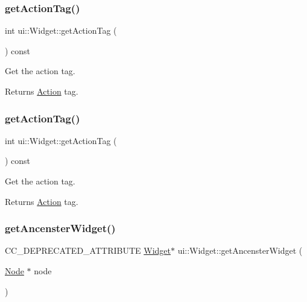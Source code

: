 \mbox{\label{classui_1_1Widget_abced1bc5fc63741d0625f37bf4f234c2}} 
\subsubsection{\texorpdfstring{get\+Action\+Tag()}{getActionTag()}\hspace{0.1cm}{\footnotesize\ttfamily [1/2]}}
{\footnotesize\ttfamily int ui\+::\+Widget\+::get\+Action\+Tag (\begin{DoxyParamCaption}{ }\end{DoxyParamCaption}) const}

Get the action tag. \begin{DoxyReturn}{Returns}
\hyperlink{classAction}{Action} tag. 
\end{DoxyReturn}
\mbox{\label{classui_1_1Widget_abced1bc5fc63741d0625f37bf4f234c2}} 
\subsubsection{\texorpdfstring{get\+Action\+Tag()}{getActionTag()}\hspace{0.1cm}{\footnotesize\ttfamily [2/2]}}
{\footnotesize\ttfamily int ui\+::\+Widget\+::get\+Action\+Tag (\begin{DoxyParamCaption}{ }\end{DoxyParamCaption}) const}

Get the action tag. \begin{DoxyReturn}{Returns}
\hyperlink{classAction}{Action} tag. 
\end{DoxyReturn}
\mbox{\label{classui_1_1Widget_a84a716b7fe8a0e98444a6a231e011fe0}} 
\subsubsection{\texorpdfstring{get\+Ancenster\+Widget()}{getAncensterWidget()}}
{\footnotesize\ttfamily C\+C\+\_\+\+D\+E\+P\+R\+E\+C\+A\+T\+E\+D\+\_\+\+A\+T\+T\+R\+I\+B\+U\+TE \hyperlink{classui_1_1Widget}{Widget}$\ast$ ui\+::\+Widget\+::get\+Ancenster\+Widget (\begin{DoxyParamCaption}\item[{\hyperlink{classNode}{Node} $\ast$}]{node }\end{DoxyParamCaption})\hspace{0.3cm}{\ttfamily [protected]}}

